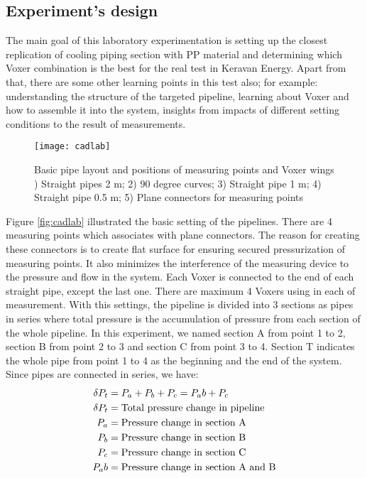 \subsection{Experiment's design}
The main goal of this laboratory experimentation is setting up the closest replication of cooling piping section with PP material and determining which Voxer combination is the best for the real test in Keravan Energy. Apart from that, there are some other learning points in this test also; for example: understanding the structure of the targeted pipeline, learning about Voxer and how to assemble it into the system, insights from impacts of different setting conditions to the result of measurements.
\begin{figure}[h]
  \centering
  \texttt{[image: cadlab]}
  \caption{ Basic pipe layout and positions of measuring points and Voxer wings ) Straight pipes 2 m; 2) 90 degree curves; 3) Straight pipe 1 m; 4) Straight pipe 0.5 m; 5) Plane connectors for measuring points}
  \label{fig:cadlab}
\end{figure}
Figure \vref{fig:cadlab} illustrated the basic setting of the pipelines. There are 4 measuring points which associates with plane connectors. The reason for creating these connectors is to create flat surface for ensuring secured pressurization of measuring points. It also minimizes the interference of the measuring device to the pressure and flow in the system. Each Voxer is connected to the end of each straight pipe, except the last one. There are maximum 4 Voxers using in each of measurement. With this settings, the pipeline is divided into 3 sections as pipes in series where total pressure is the accumulation of pressure from each section of the whole pipeline. In this experiment, we named section A from point 1 to 2, section B from point 2 to 3 and section C from point 3 to 4. Section T indicates the whole pipe from point 1 to 4 as the beginning and the end of the system. 
Since pipes are connected in series, we have:
\begin{align}
\delta P_t&= P_a + P_b + P_c = P_ab + P_c \\
\delta P_t&= \textnormal{Total pressure change in pipeline} \\
P_a&= \textnormal{Pressure change in section A} \\
P_b&= \textnormal{Pressure change in section B} \\
P_c&= \textnormal{Pressure change in section C} \\
P_ab&= \textnormal{Pressure change in section A and B} \\
\end{align}
